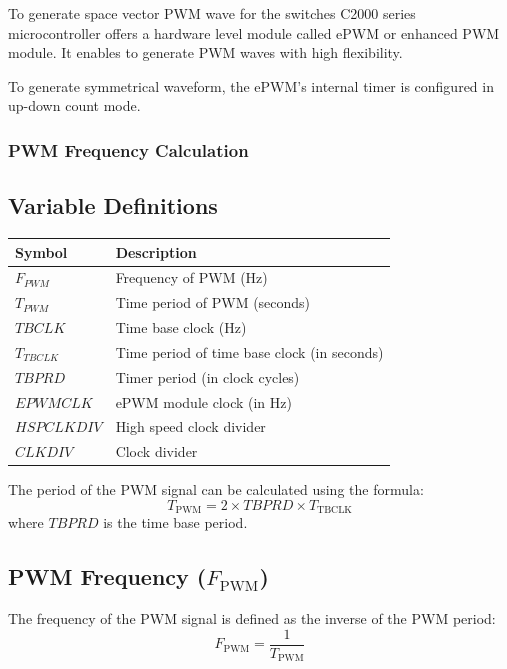 To generate space vector PWM wave for the switches C2000 series microcontroller offers a hardware level module called ePWM or enhanced PWM module. It enables to generate PWM waves with high flexibility.

To generate symmetrical waveform, the ePWM's internal timer is configured in up-down count mode.

\subsubsection{PWM Frequency Calculation}

\subsection*{Variable Definitions}

\renewcommand{\arraystretch}{1.5}
\begin{tabular}{|>{\bfseries}l|l|}
	\hline
	Symbol      & Description                                 \\ \hline
	$F_{PWM}$   & Frequency of PWM (Hz)                       \\ \hline
	$T_{PWM}$   & Time period of PWM (seconds)                \\ \hline
	$TBCLK$     & Time base clock (Hz)                        \\ \hline
	$T_{TBCLK}$ & Time period of time base clock (in seconds) \\ \hline
	$TBPRD$     & Timer period (in clock cycles)              \\ \hline
	$EPWMCLK$   & ePWM module clock (in Hz)                   \\ \hline
	$HSPCLKDIV$ & High speed clock divider                    \\ \hline
	$CLKDIV$    & Clock divider                               \\ \hline
\end{tabular}

\vspace{0.2in}

The period of the PWM signal can be calculated using the formula:
\[
	T_{\text{PWM}} = 2 \times TBPRD \times T_{\text{TBCLK}}
\]
where \( TBPRD \) is the time base period.

\subsection{PWM Frequency (\( F_{\text{PWM}} \))}
The frequency of the PWM signal is defined as the inverse of the PWM period:
\[
	F_{\text{PWM}} = \frac{1}{T_{\text{PWM}}}
\]

